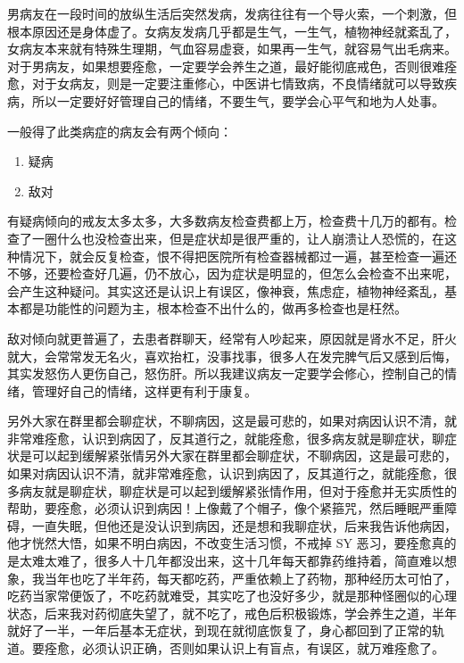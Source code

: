 \documentclass[fontset=founder]{ctexart}
\begin{document}
男病友在一段时间的放纵生活后突然发病，发病往往有一个导火索，一个刺激，但根本原因还是身体虚了。女病友发病几乎都是生气，一生气，植物神经就紊乱了，女病友本来就有特殊生理期，气血容易虚衰，如果再一生气，就容易气出毛病来。对于男病友，如果想要痊愈，一定要学会养生之道，最好能彻底戒色，否则很难痊愈，对于女病友，则是一定要注重修心，中医讲七情致病，不良情绪就可以导致疾病，所以一定要好好管理自己的情绪，不要生气，要学会心平气和地为人处事。

一般得了此类病症的病友会有两个倾向：

\begin{enumerate}
    \item 疑病
    \item 敌对
\end{enumerate}

有疑病倾向的戒友太多太多，大多数病友检查费都上万，检查费十几万的都有。检查了一圈什么也没检查出来，但是症状却是很严重的，让人崩溃让人恐慌的，在这种情况下，就会反复检查，恨不得把医院所有检查器械都过一遍，甚至检查一遍还不够，还要检查好几遍，仍不放心，因为症状是明显的，但怎么会检查不出来呢，会产生这种疑问。其实这还是认识上有误区，像神衰，焦虑症，植物神经紊乱，基本都是功能性的问题为主，根本检查不出什么的，做再多检查也是枉然。

敌对倾向就更普遍了，去患者群聊天，经常有人吵起来，原因就是肾水不足，肝火就大，会常常发无名火，喜欢抬杠，没事找事，很多人在发完脾气后又感到后悔，其实发怒伤人更伤自己，怒伤肝。所以我建议病友一定要学会修心，控制自己的情绪，管理好自己的情绪，这样更有利于康复。

另外大家在群里都会聊症状，不聊病因，这是最可悲的，如果对病因认识不清，就非常难痊愈，认识到病因了，反其道行之，就能痊愈，很多病友就是聊症状，聊症状是可以起到缓解紧张情另外大家在群里都会聊症状，不聊病因，这是最可悲的，如果对病因认识不清，就非常难痊愈，认识到病因了，反其道行之，就能痊愈，很多病友就是聊症状，聊症状是可以起到缓解紧张情作用，但对于痊愈并无实质性的帮助，要痊愈，必须认识到病因！上像戴了个帽子，像个紧箍咒，然后睡眠严重障碍，一直失眠，但他还是没认识到病因，还是想和我聊症状，后来我告诉他病因，他才恍然大悟，如果不明白病因，不改变生活习惯，不戒掉 SY 恶习，要痊愈真的是太难太难了，很多人十几年都没出来，这十几年每天都靠药维持着，简直难以想象，我当年也吃了半年药，每天都吃药，严重依赖上了药物，那种经历太可怕了，吃药当家常便饭了，不吃药就难受，其实吃了也没好多少，就是那种怪圈似的心理状态，后来我对药彻底失望了，就不吃了，戒色后积极锻炼，学会养生之道，半年就好了一半，一年后基本无症状，到现在就彻底恢复了，身心都回到了正常的轨道。要痊愈，必须认识正确，否则如果认识上有盲点，有误区，就万难痊愈了。
\end{document}
